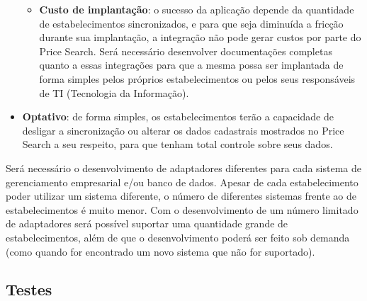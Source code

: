 \begin{itemize}
\begin{itemize}
        \item \textbf{Custo de implantação}: o sucesso da aplicação depende da quantidade de estabelecimentos sincronizados, e para que seja diminuída a fricção durante sua implantação, a integração não pode gerar custos por parte do Price Search. Será necessário desenvolver documentações completas quanto a essas integrações para que a mesma possa ser implantada de forma simples pelos próprios estabelecimentos ou pelos seus responsáveis de TI (Tecnologia da Informação).
    \end{itemize}
    \item \textbf{Optativo}: de forma simples, os estabelecimentos terão a capacidade de desligar a sincronização ou alterar os dados cadastrais mostrados no Price Search a seu respeito, para que tenham total controle sobre seus dados. 
\end{itemize}

Será necessário o desenvolvimento de adaptadores diferentes para cada sistema de gerenciamento empresarial e/ou banco de dados. Apesar de cada estabelecimento poder utilizar um sistema diferente, o número de diferentes sistemas frente ao de estabelecimentos é muito menor. Com o desenvolvimento de um número limitado de adaptadores será possível suportar uma quantidade grande de estabelecimentos, além de que o desenvolvimento poderá ser feito sob demanda (como quando for encontrado um novo sistema que não for suportado).

\subsection{Testes}

